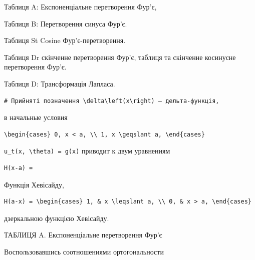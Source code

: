 \documentclass[
  ukrainian,
]{article}
\begin{document}
Таблиця A: Експоненціальне перетворення Фур'є,

Таблиця B: Перетворення синуса Фур'є.

Таблиця St Cosine Фур'є-перетворення.

Таблиця Dr скінченне перетворення Фур'є, таблиця та скінченне косинусне
перетворення Фур'є.

Таблиця D: Трансформація Лапласа.

\begin{verbatim}
# Прийняті позначення \delta\left(x\right) — дельта-функція,
\end{verbatim}

в начальные условия

\begin{verbatim}
\begin{cases} 0, x < a, \\ 1, x \geqslant a, \end{cases}
\end{verbatim}

\texttt{u\_t(x,\ \textbackslash{}theta)\ =\ g(x)} приводит к двум
уравнениям

\begin{verbatim}
H(x-a) =
\end{verbatim}

Функція Хевісайду,

\begin{verbatim}
H(a-x) = \begin{cases} 1, & x \leqslant a, \\ 0, & x > a, \end{cases}
\end{verbatim}

дзеркальною функцією Хевісайду.

ТАБЛИЦЯ A. Експоненціальне перетворення Фур'є

Воспользовавшись соотношениями ортогональности
\end{document}
